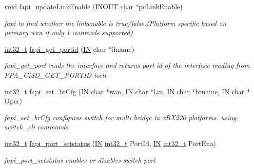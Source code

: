 \begin{DoxyCompactItemize}
void \hyperlink{group__FAPI__SYSTEM_ga05883443eefebbb0fcdb3f54bc575a57}{fapi\-\_\-update\-Link\-Enable} (\hyperlink{group__LIBHELP_ga62766f3ea8784d1db62df989f8f33d2d}{I\-N\-O\-U\-T} char $\ast$pc\-Link\-Enable)
\begin{DoxyCompactList}\small\item\em fapi to find whether the linkenable is true/false.(Platform specific based on primary wan if only 1 wanmode supported) \end{DoxyCompactList}\item 
\hyperlink{commondefs_8h_a32f2e37ee053cf2ce8ca28d1f74630e5}{int32\-\_\-t} \hyperlink{group__FAPI__SYSTEM_ga9aab02a52ec7d0b5f88e95e523c84ced}{fapi\-\_\-get\-\_\-portid} (\hyperlink{group__LIBHELP_gac2bbd6d630a06a980d9a92ddb9a49928}{I\-N} char $\ast$ifname)
\begin{DoxyCompactList}\small\item\em fapi\-\_\-get\-\_\-port reads the interface and returns port id of the interface  reading from P\-P\-A\-\_\-\-C\-M\-D\-\_\-\-G\-E\-T\-\_\-\-P\-O\-R\-T\-I\-D ioctl \end{DoxyCompactList}\item 
\hyperlink{commondefs_8h_a32f2e37ee053cf2ce8ca28d1f74630e5}{int32\-\_\-t} \hyperlink{group__FAPI__SYSTEM_ga33c62931f782db70888067b4ecd498c0}{fapi\-\_\-set\-\_\-br\-Cfg} (\hyperlink{group__LIBHELP_gac2bbd6d630a06a980d9a92ddb9a49928}{I\-N} char $\ast$wan, \hyperlink{group__LIBHELP_gac2bbd6d630a06a980d9a92ddb9a49928}{I\-N} char $\ast$lan, \hyperlink{group__LIBHELP_gac2bbd6d630a06a980d9a92ddb9a49928}{I\-N} char $\ast$brname, \hyperlink{group__LIBHELP_gac2bbd6d630a06a980d9a92ddb9a49928}{I\-N} char $\ast$Oper)
\begin{DoxyCompactList}\small\item\em fapi\-\_\-set\-\_\-br\-Cfg configures switch for multi bridge in x\-R\-X220 platforms.  using switch\-\_\-cli commands \end{DoxyCompactList}\item 
\hyperlink{commondefs_8h_a32f2e37ee053cf2ce8ca28d1f74630e5}{int32\-\_\-t} \hyperlink{group__FAPI__SYSTEM_ga8342acf74ddb92ee1d14d91907b27655}{fapi\-\_\-port\-\_\-setstatus} (\hyperlink{group__LIBHELP_gac2bbd6d630a06a980d9a92ddb9a49928}{I\-N} \hyperlink{commondefs_8h_a32f2e37ee053cf2ce8ca28d1f74630e5}{int32\-\_\-t} Port\-Id, \hyperlink{group__LIBHELP_gac2bbd6d630a06a980d9a92ddb9a49928}{I\-N} \hyperlink{commondefs_8h_a32f2e37ee053cf2ce8ca28d1f74630e5}{int32\-\_\-t} Port\-Ena)
\begin{DoxyCompactList}\small\item\em fapi\-\_\-port\-\_\-setstatus enables or disables switch port \end{DoxyCompactList}\item 

\end{DoxyCompactItemize}

